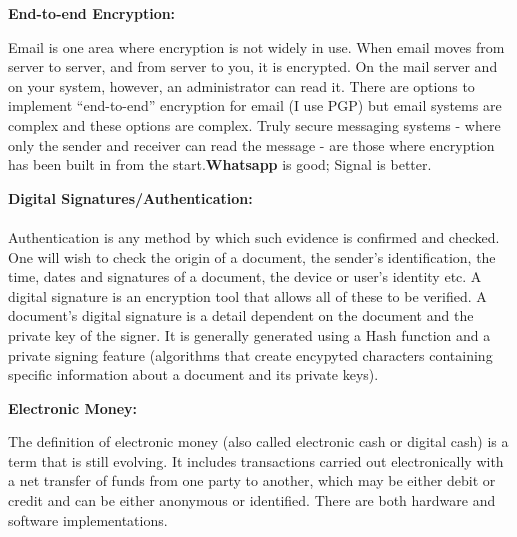\documentclass[a4paper,12pt]{article}
\begin{document}
        \vspace*{0.5cm}

        \large{{\bf End-to-end Encryption:}}


        \vspace*{0.5cm}


        Email is one area where encryption is not widely in use. When email moves from server to server, and from server to you, it is encrypted. On the mail server and on your system, however, an administrator can read it. There are options to implement “end-to-end” encryption for email (I use PGP) but email systems are complex and these options are complex. Truly secure messaging systems - where only the sender and receiver can read the message - are those where encryption has been built in from the start.{\bf Whatsapp} is good; Signal is better.

        \vspace*{0.5cm}

        \large{{\bf Digital Signatures/Authentication:}}

        \paragraph*{}

        Authentication is any method by which such evidence is confirmed and checked. One will wish to check the origin of a document, the sender's identification, the time, dates and signatures of a document, the device or user's identity etc. A digital signature is an encryption tool that allows all of these to be verified. A document's digital signature is a detail dependent on the document and the private key of the signer. It is generally generated using a Hash function and a private signing feature (algorithms that create encypyted characters containing specific information about a document and its private keys).

        \vspace*{0.5cm}

        \large{{\bf Electronic Money:}}

        \vspace*{0.4cm}


        The definition of electronic money (also called electronic cash or digital cash) is a term that is still evolving. It includes transactions carried out electronically with a net transfer of funds from one party to another, which may be either debit or credit and can be either anonymous or identified. There are both hardware and software implementations.
        
\end{document}
